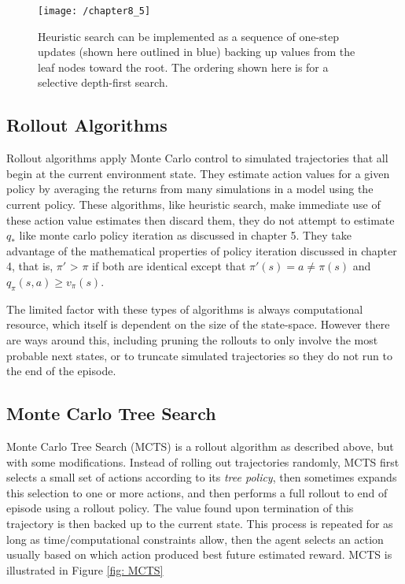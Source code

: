\begin{figure}
	\centering
	\texttt{[image: /chapter8\_5]}
	\caption{Heuristic search can be implemented as a sequence of one-step updates (shown here outlined in blue) backing up values from the leaf nodes toward the root. The ordering shown here is for a selective depth-first search.}
	\label{fig: heuristic search}
\end{figure}

\subsection{Rollout Algorithms}
Rollout algorithms apply Monte Carlo control to simulated trajectories that all begin at the current environment state. They estimate action values for a given policy by averaging the returns from many simulations in a model using the current policy. These algorithms, like heuristic search, make immediate use of these action value estimates then discard them, they do not attempt to estimate $q_*$ like monte carlo policy iteration as discussed in chapter 5. They take advantage of the mathematical properties of policy iteration discussed in chapter 4, that is, $\pi'$ > $\pi$ if both are identical except that $\pi'(s) = a \neq \pi(s)$ and $q_{\pi}(s,a) \geq v_\pi(s)$.

The limited factor with these types of algorithms is always computational resource, which itself is dependent on the size of the state-space. However there are ways around this, including pruning the rollouts to only involve the most probable next states, or to truncate simulated trajectories so they do not run to the end of the episode.

\subsection{Monte Carlo Tree Search}
Monte Carlo Tree Search (MCTS) is a rollout algorithm as described above, but with some modifications. Instead of rolling out trajectories randomly, MCTS first selects a small set of actions according to its \textit{tree policy}, then sometimes expands this selection to one or more actions, and then performs a full rollout to end of episode using a rollout policy. The value found upon termination of this trajectory is then backed up to the current state. This process is repeated for as long as time/computational constraints allow, then the agent selects an action usually based on which action produced best future estimated reward. MCTS is illustrated in Figure \ref{fig: MCTS}

